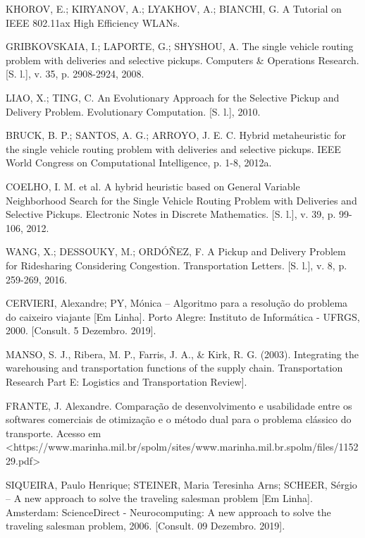 \documentclass[12pt]{article}
\begin{document}
KHOROV, E.; KIRYANOV, A.; LYAKHOV, A.; BIANCHI, G. A Tutorial on IEEE 802.11ax High Efficiency WLANs.

\newline GRIBKOVSKAIA, I.; LAPORTE, G.; SHYSHOU, A. The single vehicle routing problem with deliveries and selective pickups. Computers & Operations Research. [S. l.], v. 35, p. 2908-2924, 2008.

\newline LIAO, X.; TING, C. An Evolutionary Approach for the Selective Pickup and Delivery Problem. Evolutionary Computation. [S. l.], 2010.

\newline BRUCK, B. P.; SANTOS, A. G.; ARROYO, J. E. C. Hybrid metaheuristic for the single vehicle routing problem with deliveries and selective pickups. IEEE World Congress on Computational Intelligence, p. 1-8, 2012a.

\newline COELHO, I. M. et al. A hybrid heuristic based on General Variable Neighborhood Search for the Single Vehicle Routing Problem with Deliveries and Selective Pickups. Electronic Notes in Discrete Mathematics. [S. l.], v. 39, p. 99-106, 2012.

\newline WANG, X.; DESSOUKY, M.; ORDÓÑEZ, F. A Pickup and Delivery Problem for Ridesharing Considering Congestion. Transportation Letters. [S. l.], v. 8, p. 259-269, 2016.

\newline CERVIERI, Alexandre; PY, Mónica – Algoritmo para a resolução do problema do caixeiro viajante [Em Linha]. Porto Alegre: Instituto de Informática - UFRGS, 2000. [Consult. 5 Dezembro. 2019]. 

\newline MANSO, S. J., Ribera, M. P., Farris, J. A., & Kirk, R. G. (2003). Integrating the warehousing and transportation functions of the supply chain. Transportation Research Part E: Logistics and Transportation Review].

\newline FRANTE, J. Alexandre. Comparação de desenvolvimento e usabilidade entre os softwares comerciais de otimização e o método dual para o problema clássico do transporte. Acesso em <https://www.marinha.mil.br/spolm/sites/www.marinha.mil.br.spolm/files/115229.pdf>

\newline SIQUEIRA, Paulo Henrique; STEINER, Maria Teresinha Arns; SCHEER, Sérgio – A new approach to solve the traveling salesman problem [Em Linha]. Amsterdam: ScienceDirect - Neurocomputing: A new approach to solve the traveling salesman problem, 2006. [Consult. 09 Dezembro. 2019].
\end{document}
